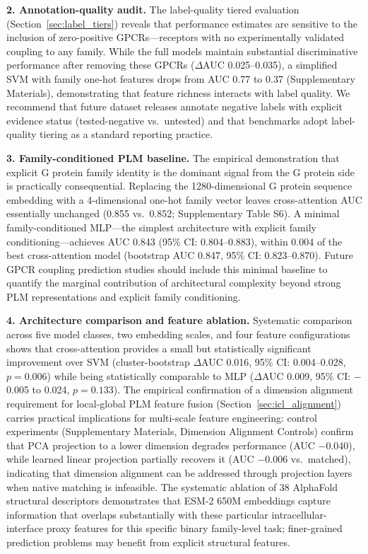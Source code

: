 \documentclass[11pt,a4paper]{article}
\begin{document}
\textbf{2. Annotation-quality audit.} The label-quality tiered evaluation (Section~\ref{sec:label_tiers}) reveals that performance estimates are sensitive to the inclusion of zero-positive GPCRs---receptors with no experimentally validated coupling to any family. While the full models maintain substantial discriminative performance after removing these GPCRs ($\Delta$AUC 0.025--0.035), a simplified SVM with family one-hot features drops from AUC 0.77 to 0.37 (Supplementary Materials), demonstrating that feature richness interacts with label quality. We recommend that future dataset releases annotate negative labels with explicit evidence status (tested-negative vs.\ untested) and that benchmarks adopt label-quality tiering as a standard reporting practice.

\textbf{3. Family-conditioned PLM baseline.} The empirical demonstration that explicit G protein family identity is the dominant signal from the G protein side is practically consequential. Replacing the 1280-dimensional G protein sequence embedding with a 4-dimensional one-hot family vector leaves cross-attention AUC essentially unchanged (0.855 vs.\ 0.852; Supplementary Table S6). A minimal family-conditioned MLP---the simplest architecture with explicit family conditioning---achieves AUC 0.843 (95\% CI: 0.804--0.883), within 0.004 of the best cross-attention model (bootstrap AUC 0.847, 95\% CI: 0.823--0.870). Future GPCR coupling prediction studies should include this minimal baseline to quantify the marginal contribution of architectural complexity beyond strong PLM representations and explicit family conditioning.

\textbf{4. Architecture comparison and feature ablation.} Systematic comparison across five model classes, two embedding scales, and four feature configurations shows that cross-attention provides a small but statistically significant improvement over SVM (cluster-bootstrap $\Delta$AUC 0.016, 95\% CI: 0.004--0.028, $p = 0.006$) while being statistically comparable to MLP ($\Delta$AUC 0.009, 95\% CI: $-$0.005 to 0.024, $p = 0.133$). The empirical confirmation of a dimension alignment requirement for local-global PLM feature fusion (Section~\ref{sec:icl_alignment}) carries practical implications for multi-scale feature engineering: control experiments (Supplementary Materials, Dimension Alignment Controls) confirm that PCA projection to a lower dimension degrades performance (AUC $-$0.040), while learned linear projection partially recovers it (AUC $-$0.006 vs.\ matched), indicating that dimension alignment can be addressed through projection layers when native matching is infeasible. The systematic ablation of 38 AlphaFold structural descriptors demonstrates that ESM-2 650M embeddings capture information that overlaps substantially with these particular intracellular-interface proxy features for this specific binary family-level task; finer-grained prediction problems may benefit from explicit structural features.
\end{document}
